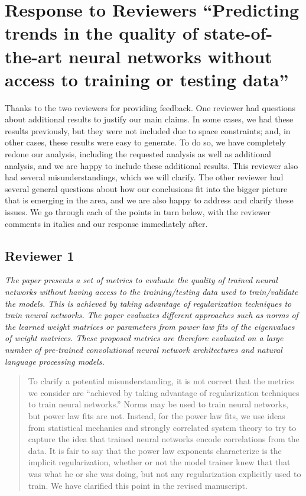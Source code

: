 \documentclass[11pt]{article}
\begin{document}
\section*{Response to Reviewers
``Predicting trends in the quality of state-of-the-art neural networks without access to training or testing data''
}

Thanks to the two reviewers for providing feedback.
One reviewer had questions about additional results to justify our main claims.
In some cases, we had these results previously, but they were not included due to space constraints; and, in other cases, these results were easy to generate.
To do so, we have completely redone our analysis, including the requested analysis as well as additional analysis, and we are happy to include these additional results.
This reviewer also had several misunderstandings, which we will clarify.
The other reviewer had several general questions about how our conclusions fit into the bigger picture that is emerging in the area, and we are also happy to address and clarify these issues.
We go through each of the points in turn below, with the reviewer comments in italics and our response immediately after.


\subsection*{Reviewer 1}

\emph{%
The paper presents a set of metrics to evaluate the quality of trained neural networks without having access to the training/testing data used to train/validate the models. 
This is achieved by taking advantage of regularization techniques to train neural networks. 
The paper evaluates different approaches such as norms of the learned weight matrices or parameters from power law fits of the eigenvalues of weight matrices. 
These proposed metrics are therefore evaluated on a large number of pre-trained convolutional neural network architectures and natural language processing models.
}

\begin{quote}
To clarify a potential misunderstanding, it is not correct that the metrics we consider are
``achieved by taking advantage of regularization techniques to train neural networks.'' 
Norms may be used to train neural networks, but power law fits are not.
Instead, for the power law fits, we use ideas from statistical mechanics and strongly correlated system theory to try to capture the idea that trained neural networks encode correlations from the data.
It is fair to say that the power law exponents characterize is the implicit regularization, whether or not the model trainer knew that that was what he or she was doing, but not any regularization explicitly used to train.
We have clarified this point
in the revised manuscript.
\end{quote}
\end{document}
